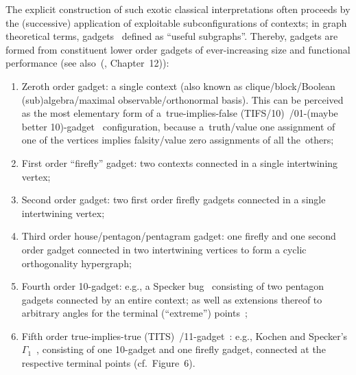 The explicit construction of such exotic classical interpretations
often proceeds by the (successive) application of exploitable subconfigurations of contexts; in graph theoretical terms, {gadgets}~\cite{tutte_1954,SZABO2009436,Ramanathan-18} defined as ``useful subgraphs''.
Thereby, gadgets are formed from constituent lower order gadgets of ever-increasing size and functional performance
(see also~(\cite{svozil-2016-pu-book}, Chapter~12)):
\begin{enumerate}

\item Zeroth order gadget: a single context (also known as clique/block/Boolean (sub)algebra/maximal observable/orthonormal basis).
This can be perceived as the most elementary form of a~true-implies-false (TIFS/10)~\cite{2018-minimalYIYS}/01-(maybe better 10)-gadget~\cite{svozil-2006-omni,Ramanathan-18}
configuration, because a~truth/value one assignment of one of the vertices implies falsity/value zero assignments of all the~others;

\item First order ``firefly'' gadget: two contexts connected in a single intertwining vertex;

\item Second order gadget: two first order firefly gadgets connected in a single intertwining vertex;

\item Third order house/pentagon/pentagram gadget: one firefly and one second order gadget connected in two intertwining vertices to form a cyclic orthogonality hypergraph;

\item Fourth order 10-gadget: e.g., a Specker bug~\cite{2018-minimalYIYS} consisting of two pentagon gadgets connected by an entire context;
as well as extensions thereof to arbitrary angles for the terminal (``extreme'') points~\cite{2015-AnalyticKS,Ramanathan-18};

\item Fifth order true-implies-true (TITS)~\cite{2018-minimalYIYS}/11-gadget~\cite{svozil-2006-omni}: e.g., Kochen and Specker's $\Gamma_1$~\cite{Kochen1}, consisting of one 10-gadget and one firefly gadget,
connected at the respective terminal points (cf.~Figure~6).
%
%
\end{enumerate}


